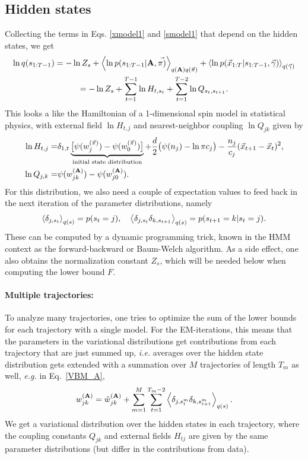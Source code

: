 \subsection{Hidden states}
Collecting the terms in Eqs. \eqref{xmodel1}
and \eqref{smodel1} that depend on the hidden states, we get
\begin{multline}\label{VBE_qs}
 \ln q(s_{1:T-1})=
-\ln Z_s+\left\langle \ln p(s_{1:T-1}|\mathbf{A},\vec{\pi)}\right\rangle_{q(\mathbf{A})q(\vec\pi)}
+\left\langle \ln p(\vec{x}_{1:T}|s_{1:T-1},\vec{\gamma})\right\rangle_{q(\vec\gamma)}\\
=-\ln Z_s +\sum_{t=1}^{T-1}\ln H_{t,s_t}+\sum_{t=1}^{T-2}\ln Q_{s_t,s_{t+1}}.
\end{multline}
This looks a like the Hamiltonian of a 1-dimensional spin model in
statistical physics, with external field $\ln H_{t,j}$ and
nearest-neighbor coupling $\ln Q_{jk}$ given by
\begin{align}
  \ln H_{t,j}=& \delta_{1,t}\underbrace{
    \big[\psi(w_j^{(\vec\pi)})-\psi(w_0^{(\vec\pi)})\big]
  }_{\text{initial state distribution}}
  +\frac d2\big(\psi(n_j)-\ln \pi c_j\big)-\frac{n_j}{c_j}(\vec{x}_{t+1}-\vec{x}_t)^2,
  \\
  \ln Q_{j,k}=&\psi(w_{jk}^{(\mathbf{A})})-\psi(w_{j0}^{(\mathbf{A})}).
\end{align}
For this distribution, we also need a couple of expectation values
to feed back in the next iteration of the parameter
distributions, namely
\begin{equation}
  \left\langle \delta_{j,s_t}\right\rangle_{q(s)}=p(s_t=j),\quad
  \left\langle \delta_{j,s_t}\delta_{k,s_{t+1}}\right\rangle_{q(s)}=p(s_{t+1}=k|s_t=j).
\end{equation}
These can be computed by a dynamic programming
trick\cite{Bishop2006,Mackay1997,Beal2003}, known in the HMM context
as the forward-backward or Baum-Welch
algorithm\cite{Rabiner1989,Baum1972}. As a side effect, one also
obtains the normalization constant $Z_s$, which will be needed below
when computing the lower bound $F$.

\paragraph{Multiple trajectories:}
To analyze many trajectories, one tries to optimize the sum of the
lower bounds for each trajectory with a single model. For the
EM-iterations, this means that the parameters in the variational
distributions get contributions from each trajectory that are just
summed up, \textit{i.e.} averages over the hidden state distribution gets
extended with a summation over $M$ trajectories of length $T_m$ as
well, \textit{e.g.} in Eq.~\eqref{VBM_A},
\begin{equation}
w_{jk}^{(\mathbf{A})}=\tilde w_{jk}^{(\mathbf{A})}
  +\sum_{m=1}^M\sum_{t=1}^{T_m-2}\left\langle \delta_{j,s^m_t}\delta_{k,s^m_{t+1}}\right\rangle_{q(s)}.
\end{equation}
We get a variational distribution over the hidden states in each
trajectory, where the coupling constants $Q_{jk}$ and external fields
$H_{tj}$ are given by the same parameter distributions (but differ in
the contributions from data).


